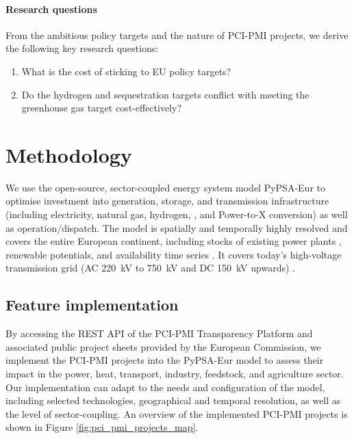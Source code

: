 \documentclass[final,5p,times,twocolumn]{elsarticle}
\let\autocite\cite
\begin{document}
\paragraph{Research questions} From the ambitious policy targets and the nature of PCI-PMI projects, we derive the following key research questions:

\begin{enumerate}
    \item What is the cost of sticking to EU policy targets?
    \item Do the hydrogen and sequestration targets conflict with meeting the greenhouse gas target cost-effectively?
 \end{enumerate}

\section{Methodology}
\label{sec:methodology}

We use the open-source, sector-coupled energy system model PyPSA-Eur \cite{neumannPotentialRoleHydrogen2023,frysztackiComparisonClusteringMethods2022,glaumOffshorePowerHydrogen2024,horschPyPSAEurOpenOptimisation2018} to optimise investment into generation, storage, and transmission infrastructure (including electricity, natural gas, hydrogen, , and Power-to-X conversion) as well as operation/dispatch. The model is spatially and temporally highly resolved and covers the entire European continent, including stocks of existing power plants \autocite{gotzensPerformingEnergyModelling2019}, renewable potentials, and availability time series \autocite{hofmannAtliteLightweightPython2021}. It covers today's high-voltage transmission grid (AC \SI{220}{kV} to \SI{750}{kV} and DC \SI{150}{kV} upwards) \autocite{xiongModellingHighVoltageGrid2024}.

\subsection{Feature implementation}
\label{sec:feature_implementation}

By accessing the REST API of the PCI-PMI Transparency Platform \autocite{europeancommissionPCIPMITransparencyPlatform2024} and associated public project sheets provided by the European Commission, we implement the PCI-PMI projects into the PyPSA-Eur model to assess their impact in the power, heat, transport, industry, feedstock, and agriculture sector. Our implementation can adapt to the needs and configuration of the model, including selected technologies, geographical and temporal resolution, as well as the level of sector-coupling. An overview of the implemented PCI-PMI projects is shown in Figure \ref{fig:pci_pmi_projects_map}.
\end{document}
